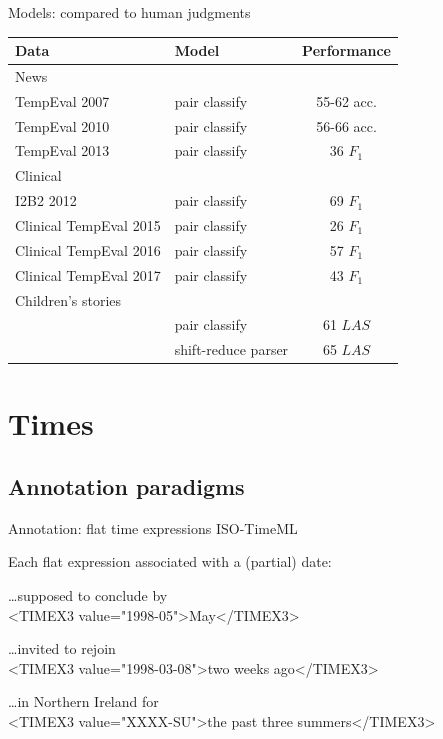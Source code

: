 \documentclass[12pt,compress]{beamer}
\newcommand{\smallcite}[1]{{\scriptsize\parencite{#1}}}
\begin{document}
\begin{frame}{Models: compared to human judgments}
\begin{tabular}{ l l c }
\hline\hline
Data & Model & Performance \\
\hline
News \\
\hline
TempEval 2007 & pair classify & 55-62 acc. \\
TempEval 2010 & pair classify & 56-66 acc. \\
TempEval 2013 & pair classify & 36 $F_1$ \\
\hline
\pause
Clinical \\
\hline
I2B2 2012 & pair classify & 69 $F_1$ \\
Clinical TempEval 2015 & pair classify & 26 $F_1$ \\
Clinical TempEval 2016 & pair classify & 57 $F_1$ \\
Clinical TempEval 2017 & pair classify & 43 $F_1$ \\
\hline
\pause
Children's stories \\
\hline
\cite{kolomiyets-etal:2012:ACL} & pair classify & 61 $LAS$ \\
\cite{kolomiyets-etal:2012:ACL} & shift-reduce parser & 65 $LAS$ \\
\hline\hline
\end{tabular}
\end{frame}


\section{Times}


\subsection{Annotation paradigms}


\begin{frame}{Annotation: flat time expressions}
\alert{%
ISO-TimeML \smallcite{pustejovsky2010iso}
\hfill
{}}
\bigskip

Each flat expression associated with a (partial) date\pause:

\ttfamily\small
\bigskip
\ldots supposed to conclude by \\
\textless TIMEX3 value="1998-05"\textgreater May\textless/TIMEX3\textgreater

\pause
\bigskip
\ldots invited to rejoin \\
\textless TIMEX3 value="1998-03-08"\textgreater two weeks ago\textless/TIMEX3\textgreater

\pause
\bigskip
\ldots in Northern Ireland for \\
\textless TIMEX3 value="XXXX-SU"\textgreater the past three summers\textless/TIMEX3\textgreater
\end{frame}
\end{document}
